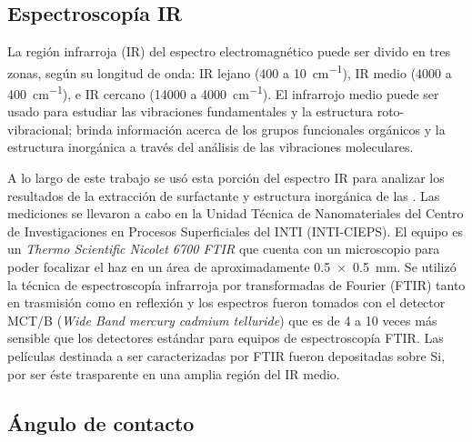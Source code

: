 	
	\subsection{Espectroscopía IR}\label{sec:IR}

		La región infrarroja (IR) del  espectro electromagnético puede ser divido en tres zonas, según su longitud de onda: IR lejano (400 a \SI{10}{\cm^{-1}}), IR medio (4000 a \SI{400}{\cm^{-1}}), e IR cercano (14000 a \SI{4000}{\cm^{-1}}). El infrarrojo medio puede ser usado para estudiar las vibraciones fundamentales y la estructura roto-vibracional; brinda información acerca de los grupos funcionales orgánicos y la estructura inorgánica a través del análisis de las vibraciones moleculares.\cite{Atkins2006,Barrow1962,Stuart2004} 
		
		A lo largo de este trabajo se usó esta porción del espectro IR para analizar los resultados de la extracción de surfactante y estructura inorgánica de las \pdm. Las mediciones se llevaron a cabo en la Unidad Técnica de Nanomateriales del Centro de Investigaciones en Procesos Superficiales del INTI (INTI-CIEPS). El equipo es un \textit{Thermo Scientific Nicolet 6700 FTIR} que cuenta con un microscopio para poder focalizar el haz en un área de aproximadamente \SI{0.5x0.5}{\mm}. Se utilizó la técnica de espectroscopía infrarroja por transformadas de Fourier (FTIR) tanto en trasmisión como en reflexión y los espectros fueron tomados con el detector MCT/B (\textit{Wide Band mercury cadmium telluride}) que es de 4 a 10 veces más sensible que los detectores estándar para equipos de espectroscopía FTIR.\cite{Nicholet2007} Las películas destinada a ser caracterizadas por FTIR fueron depositadas sobre Si, por ser éste trasparente en una amplia región del IR medio.

	\subsection{Ángulo de contacto}

